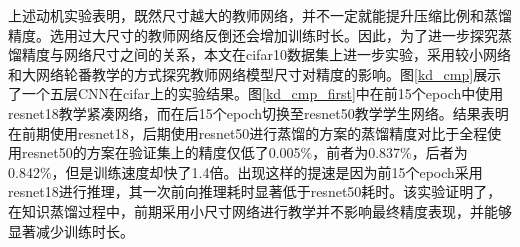 上述动机实验表明，既然尺寸越大的教师网络，并不一定就能提升压缩比例和蒸馏精度。选用过大尺寸的教师网络反倒还会增加训练时长。因此，为了进一步探究蒸馏精度与网络尺寸之间的关系，本文在cifar10数据集上进一步实验，采用较小网络和大网络轮番教学的方式探究教师网络模型尺寸对精度的影响。图\ref{kd_cmp}展示了一个五层CNN在cifar上的实验结果。图\ref{kd_cmp_first}中在前15个epoch中使用resnet18教学紧凑网络，而在后15个epoch切换至resnet50教学学生网络。结果表明在前期使用resnet18，后期使用resnet50进行蒸馏的方案的蒸馏精度对比于全程使用resnet50的方案在验证集上的精度仅低了0.005\%，前者为0.837\%，后者为0.842\%，但是训练速度却快了1.4倍。出现这样的提速是因为前15个epoch采用resnet18进行推理，其一次前向推理耗时显著低于resnet50耗时。该实验证明了，在知识蒸馏过程中，前期采用小尺寸网络进行教学并不影响最终精度表现，并能够显著减少训练时长。

\begin{figure}[h]
	\centering
\end{figure}

